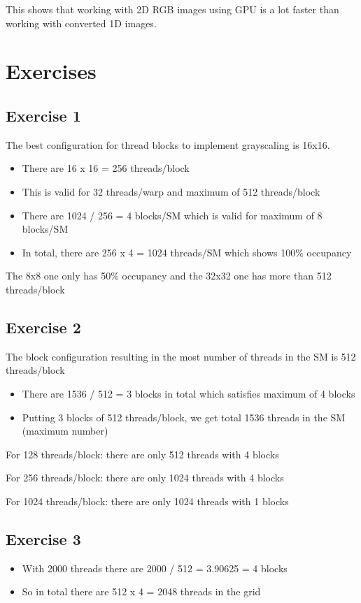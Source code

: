 \documentclass{article}
\begin{document}
This shows that working with 2D RGB images using GPU is a lot faster than working with converted 1D images.

\section{Exercises}
\subsection{Exercise 1}
The best configuration for thread blocks to implement grayscaling is 16x16.

\begin{itemize}
  \item There are 16 x 16 = 256 threads/block
  \item This is valid for 32 threads/warp and maximum of 512 threads/block
  \item There are 1024 / 256 = 4 blocks/SM which is valid for maximum of 8 blocks/SM
  \item In total, there are 256 x 4 = 1024 threads/SM which shows 100\% occupancy
\end{itemize}

The 8x8 one only has 50\% occupancy and the 32x32 one has more than 512 threads/block

\subsection{Exercise 2}
The block configuration resulting in the most number of threads in the SM is 512 threads/block

\begin{itemize}
  \item There are 1536 / 512 = 3 blocks in total which satisfies maximum of 4 blocks
  \item Putting 3 blocks of 512 threads/block, we get total 1536 threads in the SM (maximum number)
\end{itemize}

For 128 threads/block: there are only 512 threads with 4 blocks

For 256 threads/block: there are only 1024 threads with 4 blocks

For 1024 threads/block: there are only 1024 threads with 1 blocks

\subsection{Exercise 3}
\begin{itemize}
  \item With 2000 threads there are 2000 / 512 = 3.90625 = 4 blocks
  \item So in total there are 512 x 4 = 2048 threads in the grid
\end{itemize}
\end{document}
